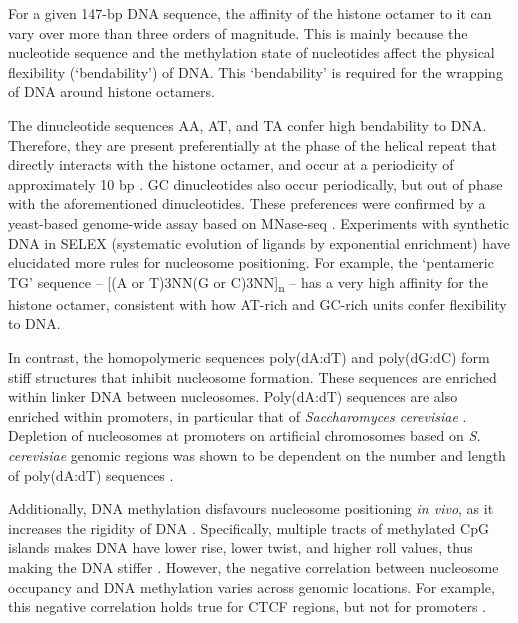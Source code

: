 \documentclass[a4paper, numbers=noenddot]{scrbook}
\begin{document}
For a given 147-bp DNA sequence, the affinity of the histone octamer to it can vary over more than three orders of magnitude.  This is mainly because the nucleotide sequence and the methylation state of nucleotides affect the physical flexibility (`bendability') of DNA.  This `bendability' is required for the wrapping of DNA around histone octamers.

The dinucleotide sequences AA, AT, and TA confer high bendability to DNA.  Therefore, they are present preferentially at the phase of the helical repeat that directly interacts with the histone octamer, and occur at a periodicity of approximately 10 bp \citep{struhl_determinants_2013}.  GC dinucleotides also occur periodically, but out of phase with the aforementioned dinucleotides.  These preferences were confirmed by a yeast-based genome-wide assay based on MNase-seq \citep{segal_genomic_2006}.  Experiments with synthetic DNA in SELEX (systematic evolution of ligands by exponential enrichment) \citep{lowary_new_1998} have elucidated more rules for nucleosome positioning.  For example, the `pentameric TG' sequence -- [(A or T)3NN(G or C)3NN]\textsubscript{n} -- has a very high affinity for the histone octamer, consistent with how AT-rich and GC-rich units confer flexibility to DNA.

In contrast, the homopolymeric sequences poly(dA:dT) and poly(dG:dC) form stiff structures that inhibit nucleosome formation.  These sequences are enriched within linker DNA between nucleosomes.  Poly(dA:dT) sequences are also enriched within promoters, in particular that of \emph{Saccharomyces cerevisiae} \citep{struhl_determinants_2013}.  Depletion of nucleosomes at promoters on artificial chromosomes based on \emph{S. cerevisiae} genomic regions was shown to be dependent on the number and length of poly(dA:dT) sequences \citep{hughes_functional_2012}. %

Additionally, DNA methylation disfavours nucleosome positioning \emph{in vivo}, as it increases the rigidity of DNA \citep{huff_dnmt1-independent_2014}.  Specifically, multiple tracts of methylated CpG islands makes DNA have lower rise, lower twist, and higher roll values, thus making the DNA stiffer \citep{rao_systematic_2018, perez_impact_2012}.  However, the negative correlation between nucleosome occupancy and DNA methylation varies across genomic locations.  For example, this negative correlation holds true for CTCF regions, but not for promoters \citep{kelly_genome-wide_2012}.
\end{document}
